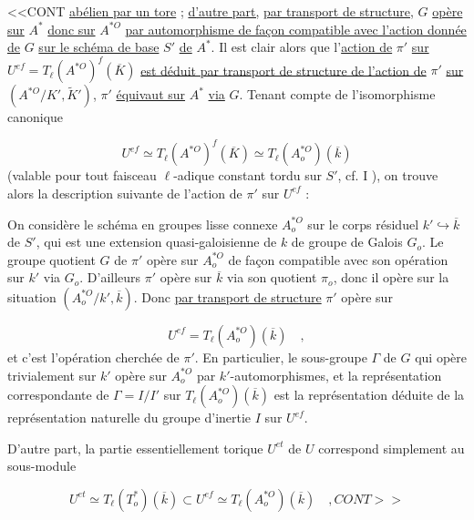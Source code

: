 <<CONT \underline{abélien par un tore} ; \underline{d'autre part,} \underline{par transport de structure}, $G$ \underline{opère} \underline{sur} $A^*$ \underline{donc sur} $A^{*O}$ \underline{par automorphisme de façon compatible avec l'action donnée de} $G$ \underline{sur le schéma de base} $S'$ \underline{de} $A^*$. Il est clair alors que l'\underline{action de} $\pi'$ \underline{sur} $U^{ef} = T_{\ell}(A^{*O})^{f}(\overline{K})$ \underline{est déduit par transport de structure de l'action de} $\pi'$ \underline{sur} $(A^{*O}/K',\widetilde{K}')$, $\pi'$ \underline{équivaut sur} $A^*$ \underline{via} $G$. Tenant compte de l'isomorphisme canonique

\begin{equation}\tag{4.2.6}
U^{ef} \simeq T_{\ell}(A^{*O})^{f}(\overline{K}) \simeq T_{\ell}(A^{*O}_{o})(\overline{k})
\end{equation}
(valable pour tout faisceau $\ell$-adique constant tordu sur $S'$, cf. I \hspace{2.5em}), on trouve alors la description suivante de l'action de $\pi'$ sur $U^{ef}$ :

On considère le schéma en groupes lisse connexe $A^{*O}_{o}$ sur le corps résiduel $k' \hookrightarrow \overline{k}$ de $S'$, qui est une extension quasi-galoisienne de $k$ de groupe de Galois $G_{o}$. Le groupe quotient $G$ de $\pi'$ opère sur $A^{*O}_{o}$ de façon compatible avec son opération sur $k'$ via $G_{o}$. D'ailleurs $\pi'$ opère sur $\overline{k}$ via son quotient $\pi_{o}$, donc il opère sur la situation $(A^{*O}_{o}/k',\overline{k})$. Donc \underline{par transport de structure} $\pi'$ opère sur

\begin{equation*}
U^{ef} = T_{\ell}(A^{*O}_{o})(\overline{k}) \quad ,
\end{equation*}
et c'est l'opération cherchée de $\pi'$. En particulier, le sous-groupe $\Gamma$ de $G$ qui opère trivialement sur $k'$ opère sur $A^{*O}_{o}$ par $k'$-automorphismes, et la représentation correspondante de $\Gamma = I/I'$ sur $T_{\ell}(A^{*O}_{o})(\overline{k})$ est la représentation déduite de la représentation naturelle du groupe d'inertie $I$ sur $U^{ef}$.

D'autre part, la partie essentiellement torique $U^{et}$ de $U$ correspond simplement au sous-module

\begin{equation}\tag{4.2.7}
U^{et} \simeq T_{\ell}(T^{*}_{o})(\overline{k}) \subset U^{ef} \simeq T_{\ell}(A^{*O}_{o})(\overline{k}) \quad , CONT>>
\end{equation}


